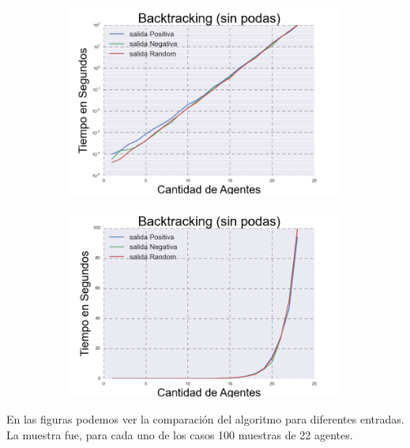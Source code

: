 \begin{figure}[h]

\begin{subfigure}{0.5\textwidth}
\includegraphics[scale=0.45]{BacktrackingLog.png}
\end{subfigure}
\begin{subfigure}{0.5\textwidth}
\includegraphics[scale=0.45]{Backtracking.png}
\end{subfigure}

\end{figure}

	En las figuras podemos ver la comparación del algoritmo para diferentes entradas. La muestra fue, para cada uno de los casos 100 muestras de 22 agentes.


